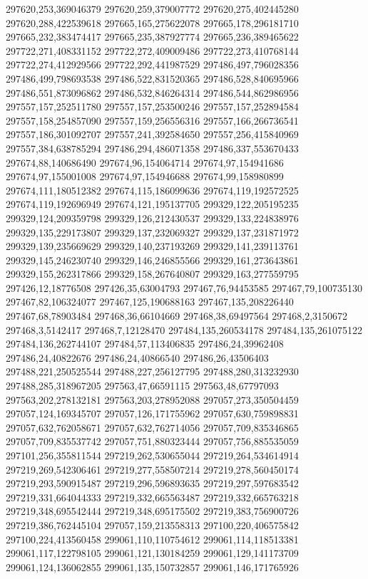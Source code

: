 297620,253,369046379
297620,259,379007772
297620,275,402445280
297620,288,422539618
297665,165,275622078
297665,178,296181710
297665,232,383474417
297665,235,387927774
297665,236,389465622
297722,271,408331152
297722,272,409009486
297722,273,410768144
297722,274,412929566
297722,292,441987529
297486,497,796028356
297486,499,798693538
297486,522,831520365
297486,528,840695966
297486,551,873096862
297486,532,846264314
297486,544,862986956
297557,157,252511780
297557,157,253500246
297557,157,252894584
297557,158,254857090
297557,159,256556316
297557,166,266736541
297557,186,301092707
297557,241,392584650
297557,256,415840969
297557,384,638785294
297486,294,486071358
297486,337,553670433
297674,88,140686490
297674,96,154064714
297674,97,154941686
297674,97,155001008
297674,97,154946688
297674,99,158980899
297674,111,180512382
297674,115,186099636
297674,119,192572525
297674,119,192696949
297674,121,195137705
299329,122,205195235
299329,124,209359798
299329,126,212430537
299329,133,224838976
299329,135,229173807
299329,137,232069327
299329,137,231871972
299329,139,235669629
299329,140,237193269
299329,141,239113761
299329,145,246230740
299329,146,246855566
299329,161,273643861
299329,155,262317866
299329,158,267640807
299329,163,277559795
297426,12,18776508
297426,35,63004793
297467,76,94453585
297467,79,100735130
297467,82,106324077
297467,125,190688163
297467,135,208226440
297467,68,78903484
297468,36,66104669
297468,38,69497564
297468,2,3150672
297468,3,5142417
297468,7,12128470
297484,135,260534178
297484,135,261075122
297484,136,262744107
297484,57,113406835
297486,24,39962408
297486,24,40822676
297486,24,40866540
297486,26,43506403
297488,221,250525544
297488,227,256127795
297488,280,313232930
297488,285,318967205
297563,47,66591115
297563,48,67797093
297563,202,278132181
297563,203,278952088
297057,273,350504459
297057,124,169345707
297057,126,171755962
297057,630,759898831
297057,632,762058671
297057,632,762714056
297057,709,835346865
297057,709,835537742
297057,751,880323444
297057,756,885535059
297101,256,355811544
297219,262,530655044
297219,264,534614914
297219,269,542306461
297219,277,558507214
297219,278,560450174
297219,293,590915487
297219,296,596893635
297219,297,597683542
297219,331,664044333
297219,332,665563487
297219,332,665763218
297219,348,695542444
297219,348,695175502
297219,383,756900726
297219,386,762445104
297057,159,213558313
297100,220,406575842
297100,224,413560458
299061,110,110754612
299061,114,118513381
299061,117,122798105
299061,121,130184259
299061,129,141173709
299061,124,136062855
299061,135,150732857
299061,146,171765926
